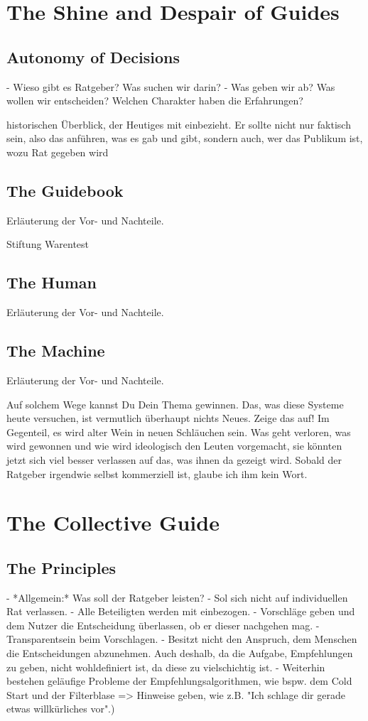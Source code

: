 \documentclass[12pt,numbers=noenddot,parskip,bibliography=totocnumbered,listof=totocnumbered]{scrreprt}
\begin{document}
\chapter{The Shine and Despair of Guides}

\section{Autonomy of Decisions}
- Wieso gibt es Ratgeber? Was suchen wir darin?
- Was geben wir ab? Was wollen wir entscheiden? Welchen Charakter haben die Erfahrungen?

historischen Überblick, der Heutiges mit einbezieht. Er sollte nicht nur faktisch sein, also das anführen, was es gab und gibt, sondern auch, wer das Publikum ist, wozu Rat gegeben wird
\section{The Guidebook}
Erläuterung der Vor- und Nachteile.

Stiftung Warentest

\section{The Human}
Erläuterung der Vor- und Nachteile.

\section{The Machine}
Erläuterung der Vor- und Nachteile.

Auf solchem Wege kannst Du Dein Thema gewinnen. Das, was diese Systeme heute versuchen, ist vermutlich überhaupt nichts Neues. Zeige das auf! Im Gegenteil, es wird alter Wein in neuen Schläuchen sein. Was geht verloren, was wird gewonnen und wie wird ideologisch den Leuten vorgemacht, sie könnten jetzt sich viel besser verlassen auf das, was ihnen da gezeigt wird.  Sobald der Ratgeber irgendwie selbst kommerziell ist, glaube ich ihm kein Wort.

\chapter{The Collective Guide}

\section{The Principles}

- *Allgemein:* Was soll der Ratgeber leisten? 
- Sol sich nicht auf individuellen Rat verlassen.
- Alle Beteiligten werden mit einbezogen.
- Vorschläge geben und dem Nutzer die Entscheidung überlassen, ob er dieser nachgehen mag.
- Transparentsein beim Vorschlagen.
- Besitzt nicht den Anspruch, dem Menschen die Entscheidungen abzunehmen. Auch deshalb, da die Aufgabe, Empfehlungen zu geben, nicht wohldefiniert ist, da diese zu vielschichtig ist.
- Weiterhin bestehen geläufige Probleme der Empfehlungsalgorithmen, wie bspw. dem Cold Start und der Filterblase => Hinweise geben, wie z.B. "Ich schlage dir gerade etwas willkürliches vor".)
\end{document}
